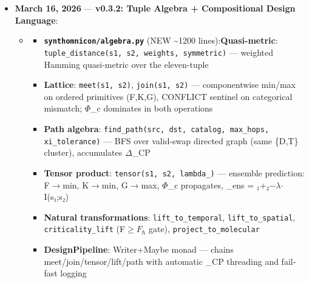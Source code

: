 \documentclass[12pt,a4paper]{article}
\begin{document}
\begin{itemize}
\begin{itemize}
    \item \textbf{Soai reaction catalog entry} (\texttt{soai\_pyrimidyl\_autocatalytic\_cycle}): D\_$\infty$, T\_⋈, R\_‡, P\_DA, $F_{\hbar}$, K\_mod, G\_ג, $\Gamma$\_$\rightarrow$(SPECIFIC), $\Phi$\_sub, 1:1. $\Delta$G‡ = 62.3 kJ/mol. \xi\_r = 15, \x$i_{\tau}$ = 7.2$\times$10¹⁵, ratio = 0.94. Full grounding (Soai 1995, Gridnev 2010, Shibata 2009).
    \item \textbf{Proline-aldol Varma probe}: \xi\_r = 6.2, \x$i_{\tau}$ = 1.8$\times$10¹⁴ ($\omega$\_c = 10¹$^{2}$ s⁻¹), ratio = 0.189 $\rightarrow$ $\Phi$\_sub confirmed (Blackmond RPKA 2004; Houk/List 2004)
    \item \textbf{db24c8 full grounding} + \texttt{\_has\_phi\_c\_candidacy()} batch filter + SYNTHONICON.md section reorder (v0.3.3 base)
    \item \texttt{\_\_init\_\_.py} version: \texttt{0.3.3}
\end{itemize}

    \item 
    \textbf{March 16, 2026} --- \textbf{v0.3.2: Tuple Algebra + Compositional Design Language}:

    \begin{itemize}
    \item 
    \begin{itemize}
    \item \textbf{\texttt{synthomnicon/algebra.py}} (NEW \textasciitilde{}1200 lines):\textbf{Quasi-metric}: \texttt{tuple\_distance(s1, s2, weights, symmetric)} --- weighted Hamming quasi-metric over the eleven-tuple
    \item \textbf{Lattice}: \texttt{meet(s1, s2)}, \texttt{join(s1, s2)} --- componentwise min/max on ordered primitives (F,K,G), CONFLICT sentinel on categorical mismatch; $\Phi$\_c dominates in both operations
    \item \textbf{Path algebra}: \texttt{find\_path(src, dst, catalog, max\_hops, xi\_tolerance)} --- BFS over valid-swap directed graph (same \{D,T\} cluster), accumulates $\Delta$\xi\_CP
    \item \textbf{Tensor product}: \texttt{tensor(s1, s2, lambda\_)} --- ensemble prediction: F$\rightarrow$min, K$\rightarrow$min, G$\rightarrow$max, $\Phi$\_c propagates, \xi\_ens = \xi₁+\xi₂$-$$\lambda$$\cdot$I(s₁;s₂)
    \item \textbf{Natural transformations}: \texttt{lift\_to\_temporal}, \texttt{lift\_to\_spatial}, \texttt{criticality\_lift} (F$\geq$$F_{\hbar}$ gate), \texttt{project\_to\_molecular}
    \item \textbf{DesignPipeline}: Writer+Maybe monad --- chains meet/join/tensor/lift/path with automatic \xi\_CP threading and fail-fast logging
\end{itemize}


\end{itemize}
\end{itemize}
\end{document}
